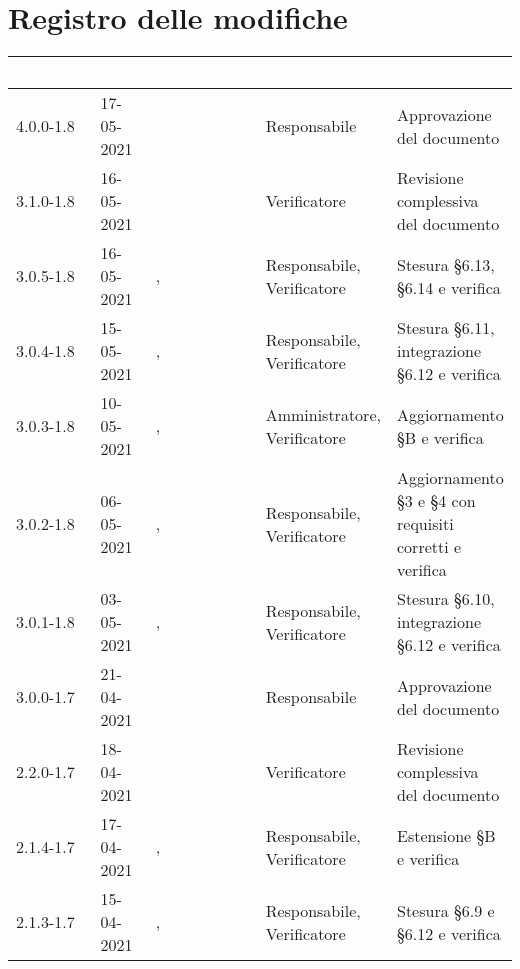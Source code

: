 \section*{Registro delle modifiche}
{
\setcounter{table}{-1}
{
\renewcommand{\arraystretch}{1.5}
\centering
\begin{longtable}{C{1.7cm} | C{2.2cm} | C{3.2cm} | C{3cm} | C{4.8cm}}
\textcolor{white}{\textbf{Versione}}&
\textcolor{white}{\textbf{Data}}&
\textcolor{white}{\textbf{Nominativo}}&
\textcolor{white}{\textbf{Ruolo}}&
\textcolor{white}{\textbf{Descrizione}}\\	
\endhead

4.0.0-1.8 & 17-05-2021 & \SP{} & Responsabile & Approvazione del documento\\

3.1.0-1.8 & 16-05-2021 & \SG{} & Verificatore & Revisione complessiva del documento\\ 

3.0.5-1.8 & 16-05-2021 & \PA{}, \ZM{} & Responsabile, Verificatore & Stesura  \S 6.13, \S 6.14 e verifica\\

3.0.4-1.8 & 15-05-2021 & \PA{}, \ZM{} & Responsabile, Verificatore & Stesura  \S 6.11, integrazione \S 6.12 e verifica\\

3.0.3-1.8 & 10-05-2021 & \RA{}, \ZM{} & Amministratore, Verificatore & Aggiornamento \S{}B e verifica \\

3.0.2-1.8 & 06-05-2021 & \SP{}, \SG{} & Responsabile, Verificatore & Aggiornamento \S{}3 e \S{}4 con requisiti corretti e verifica\\ 

3.0.1-1.8 & 03-05-2021 & \SP{}, \BM{} & Responsabile, Verificatore & Stesura \S 6.10, integrazione \S 6.12 e verifica\\

3.0.0-1.7 & 21-04-2021 & \RA{} & Responsabile & Approvazione del documento\\

2.2.0-1.7 & 18-04-2021 & \SG{} & Verificatore & Revisione complessiva del documento\\

2.1.4-1.7 & 17-04-2021 & \SH{}, \SG{} & Responsabile, Verificatore & Estensione \S B e verifica\\

2.1.3-1.7 & 15-04-2021 & \SH{}, \SG{} & Responsabile, Verificatore & Stesura \S 6.9 e \S 6.12 e verifica\\


\end{longtable}}}
